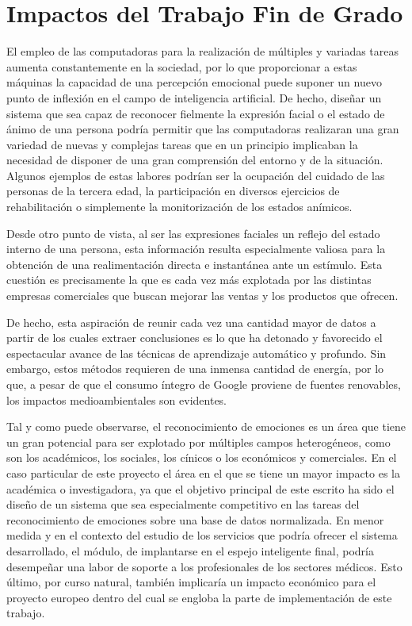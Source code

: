 \chapter{Impactos del Trabajo Fin de Grado}

El empleo de las computadoras para la realización de múltiples y variadas tareas aumenta constantemente en la sociedad, por lo que proporcionar a estas máquinas la capacidad de una percepción emocional puede suponer un nuevo punto de inflexión en el campo de inteligencia artificial. De hecho, diseñar un sistema que sea capaz de reconocer fielmente la expresión facial o el estado de ánimo de una persona podría permitir que las computadoras realizaran una gran variedad de nuevas y complejas tareas que en un principio implicaban la necesidad de disponer de una gran comprensión del entorno y de la situación. Algunos ejemplos de estas labores podrían ser la ocupación del cuidado de las personas de la tercera edad, la participación en diversos ejercicios de rehabilitación o simplemente la monitorización de los estados anímicos.

Desde otro punto de vista, al ser las expresiones faciales un reflejo del estado interno de una persona, esta información resulta especialmente valiosa para la obtención de una realimentación directa e instantánea ante un estímulo. Esta cuestión es precisamente la que es cada vez más explotada por las distintas empresas comerciales que buscan mejorar las ventas y los productos que ofrecen.

De hecho, esta aspiración de reunir cada vez una cantidad mayor de datos a partir de los cuales extraer conclusiones es lo que ha detonado y favorecido el espectacular avance de las técnicas de aprendizaje automático y profundo. Sin embargo, estos métodos requieren de una inmensa cantidad de energía, por lo que, a pesar de que el consumo íntegro de Google proviene de fuentes renovables, los impactos medioambientales son evidentes.

Tal y como puede observarse, el reconocimiento de emociones es un área que tiene un gran potencial para ser explotado por múltiples campos heterogéneos, como son los académicos, los sociales, los cínicos o los económicos y comerciales. En el caso particular de este proyecto el área en el que se tiene un mayor impacto es la académica o investigadora, ya que el objetivo principal de este escrito ha sido el diseño de un sistema que sea especialmente competitivo en las tareas del reconocimiento de emociones sobre una base de datos normalizada. En menor medida y en el contexto del estudio de los servicios que podría ofrecer el sistema desarrollado, el módulo, de implantarse en el espejo inteligente final, podría desempeñar una labor de soporte a los profesionales de los sectores médicos. Esto último, por curso natural, también implicaría un impacto económico para el proyecto europeo dentro del cual se engloba la parte de implementación de este trabajo.

\clearpage
\newpage
